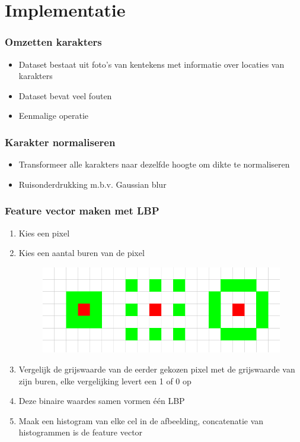 \documentclass{beamer}
\begin{document}
    \section{Implementatie}

    \begin{frame}
        \frametitle{Omzetten karakters}

        \begin{itemize}
            \item Dataset bestaat uit foto's van kentekens met informatie over
            locaties van karakters
            \item Dataset bevat veel fouten
            \item Eenmalige operatie
        \end{itemize}
    \end{frame}

    \begin{frame}
        \frametitle{Karakter normaliseren}

        \begin{itemize}
            \item Transformeer alle karakters naar dezelfde hoogte om dikte te
            normaliseren
            \item Ruisonderdrukking m.b.v. Gaussian blur
        \end{itemize}
    \end{frame}

    \begin{frame}
        \frametitle{Feature vector maken met LBP}

        \begin{enumerate}
            \item Kies een pixel
            \pause
            \item Kies een aantal buren van de pixel
            \begin{figure}
                \includegraphics[scale=.3]{neighbourhoods.png}
            \end{figure}
            \pause
            \item Vergelijk de grijswaarde van de eerder gekozen pixel met de
            grijswaarde van zijn buren, elke vergelijking levert een 1 of 0 op
            \pause
            \item Deze binaire waardes samen vormen \'e\'en LBP
            \pause
            \item Maak een histogram van elke cel in de afbeelding,
            concatenatie van histogrammen is de feature vector
        \end{enumerate}
    \end{frame}
\end{document}
